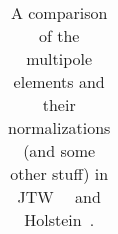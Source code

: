 \begin{table}[h!!!!t]
\begin{center}
\begin{tabular}{ | l | l | l | p{2.35in} | }
		\\  \hline
	\end{tabular}
	\end{center}
	\caption[Multipole Notation]{A comparison of the multipole elements and their normalizations (and some other stuff) in JTW~\cite{jtw}~\cite{jtw_coulomb} and Holstein~\cite{holstein}.}
	\label{table:compare_notation_multipoles}
\end{table}
\renewcommand{\arraystretch}{1}
%
%
%
%
